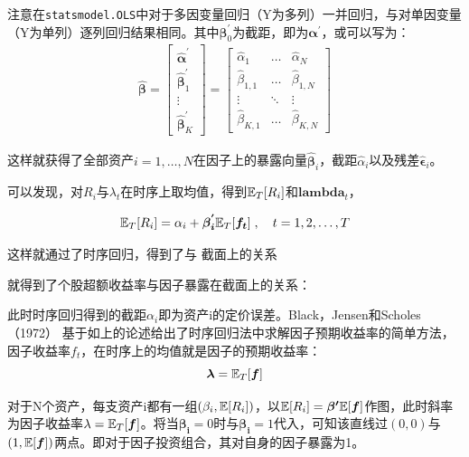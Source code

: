 \documentclass[11pt]{article}
\begin{document}
注意在\verb|statsmodel.OLS|中对于多因变量回归（Y为多列）一并回归，与对单因变量（Y为单列）逐列回归结果相同。其中$\bm{\beta}_{0}^{'}$为截距，即为$\bm{\alpha}^{'}$，或可以写为：
\begin{gather*}
    \hat{\bm{\beta}}
    = \begin{bmatrix} \bm{\hat{\alpha}}^{'} \\ \bm{\hat{\beta}}_{1}^{'} \\ \vdots \\ \bm{\hat{\beta}}_{K}^{'} \end{bmatrix}
    = \begin{bmatrix} \hat{\alpha}_{1} & \dots & \hat{\alpha}_{N} \\ \hat{\beta}_{1,1} & \dots & \hat{\beta}_{1,N} \\ \vdots & \ddots & \vdots \\ \hat{\beta}_{K,1} & \dots & \hat{\beta}_{K,N} \end{bmatrix}
\end{gather*}

这样就获得了全部资产$i=1,\dots,N$在因子上的暴露向量$\hat{\bm{\beta}}_i$，截距$\hat{\alpha}_i$以及残差$\hat{\bm{\epsilon}}_i$。

可以发现，对$R_{i}$与$\lambda_t$在时序上取均值，得到$\mathbb{E}_T[R_i]$和$\bm{lambda}_t$，

\begin{equation*}
    \mathbb{E}_T[R_i] = \alpha_i + \bm{\beta_{i}^{'}} \mathbb{E}_T[\bm{f_t}] \;,\quad t=1,2,\dots,T
\end{equation*}

这样就通过了时序回归，得到了与
截面上的关系

就得到了个股超额收益率与因子暴露在截面上的关系：


此时时序回归得到的截距$\alpha_i$即为资产i的定价误差。Black，Jensen和Scholes（1972） 基于如上的论述给出了时序回归法中求解因子预期收益率的简单方法，因子收益率$f_t$，在时序上的均值就是因子的预期收益率：
\begin{equation*}
    \bm{\lambda} = \mathbb{E}_T[\bm{f}]
\end{equation*}

对于N个资产，每支资产i都有一组$(\beta_i,\mathbb{E}[R_i])$，以$\mathbb{E}[R_i] = \bm{\beta'} \mathbb{E}[\bm{f}]$作图，此时斜率为因子收益率$\lambda=\mathbb{E}_T[\bm{f}]$。将当$\bm{\beta_i}=0$时与$\bm{\beta_i}=1$代入，可知该直线过$(0,0)$与$(1,\mathbb{E}[\bm{f}])$两点。即对于因子投资组合，其对自身的因子暴露为1。
\end{document}
